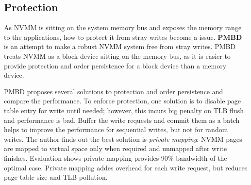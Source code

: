 

\subsection{Protection} 
\label{sec:protection}

As NVMM is sitting on the system memory bus and exposes the memory range
to the applications, how to protect it from stray writes become a issue.
\textbf{PMBD}~\cite{PMBD}
is an attempt to make a robust NVMM system free from stray writes.
PMBD treats NVMM as a block device sitting on the memory bus, as it is
easier to provide protection and order persistence for
a block device than a memory device.

PMBD proposes several solutions to protection and order persistence and
compare the performance. To enforce protection, one solution is to disable page
table entry for write until needed; however, this incurs big penalty on
TLB flush and performance is bad. Buffer the write requests and commit
them as a batch helps to improve the performance for sequential writes,
but not for random writes. The author finds out the best solution is 
\emph{private mapping}: NVMM pages are mapped to virtual space only when
required and unmapped after write finishes. Evaluation shows private
mapping provides 90\% bandwidth of the optimal case. Private mapping
addes overhead for each write request, but reduces page table size and
TLB pollution.

